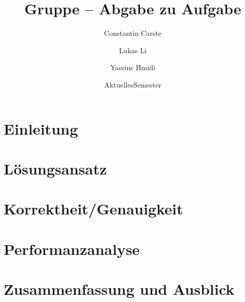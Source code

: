 \documentclass[course=erap]{aspdoc}
\author{Constantin Carste \and Lukas Li \and Yassine Hmidi}
\date{AktuellesSemester} %
\title{Gruppe \theGroup{} -- Abgabe zu Aufgabe \theNumber}
\begin{document}
\maketitle

\section{Einleitung}


\section{Lösungsansatz}


\section{Korrektheit/Genauigkeit}


\section{Performanzanalyse}


\section{Zusammenfassung und Ausblick}


{}
\end{document}
